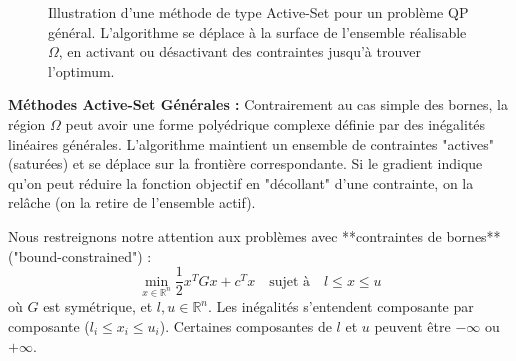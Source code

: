 \begin{figure}[H]
\centering
{}
\caption{Illustration d'une méthode de type Active-Set pour un problème QP général. L'algorithme se déplace à la surface de l'ensemble réalisable $\Omega$, en activant ou désactivant des contraintes jusqu'à trouver l'optimum.}
\label{fig:generic-active-set}
\end{figure}

\begin{figureexplanation}
\textbf{Méthodes Active-Set Générales :}
Contrairement au cas simple des bornes, la région $\Omega$ peut avoir une forme polyédrique complexe définie par des inégalités linéaires générales.
L'algorithme maintient un ensemble de contraintes "actives" (saturées) et se déplace sur la frontière correspondante. Si le gradient indique qu'on peut réduire la fonction objectif en "décollant" d'une contrainte, on la relâche (on la retire de l'ensemble actif).
\end{figureexplanation}

Nous restreignons notre attention aux problèmes avec **contraintes de bornes** ("bound-constrained") :
\begin{equation}
    \min_{x \in \mathbb{R}^n} \frac{1}{2} x^T G x + c^T x \quad \text{sujet à} \quad l \le x \le u
\end{equation}
où $G$ est symétrique, et $l, u \in \mathbb{R}^n$. Les inégalités s'entendent composante par composante ($l_i \le x_i \le u_i$). Certaines composantes de $l$ et $u$ peuvent être $-\infty$ ou $+\infty$.

